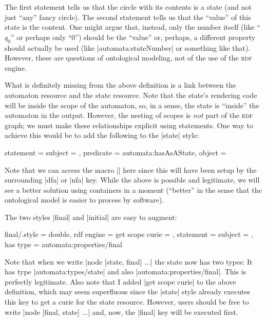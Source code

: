 The first statement tells us that the circle with its contents is a
state (and not just ``any'' fancy circle). The second statement tells
us that the ``value'' of this state is the content. One might argue
that, instead, only the number itself (like ``$q_0$'' or perhaps only
``$0$'') should be the ``value'' or, perhaps, a different property
should actually be used (like |automata:stateNumber| or something like
that). However, these are questions of ontological modeling, not of 
the use of the \textsc{rdf} engine.

What is definitely missing from the above definition is a link between
the automaton resource and the state resource. Note that the state's
rendering code will be inside the scope of the automaton, so, in a
sense, the state is ``inside'' the automaton in the output. However,
the nesting of scopes is \emph{not} part of the \textsc{rdf} graph;
we must make these relationships explicit using statements.
One way to achieve this would be to add the following to the |state|
style:

\begin{codeexample}
    statement = {
      subject     = \mylibAutomatonCurie,
      predicate   = automata:hasAsAState,
      object      = \mylibStateCurie }
\end{codeexample}

Note that we can access the macro |\mylibAutomatonCurie| here since
this will have been setup by the surrounding |dfa| or |nfa| key. While
the above is possible and legitimate, we will see a better solution
using containers in a moment (``better'' in the sense that the
ontological model is easier to process by software).

The two styles |final| and |initial| are easy to augment:

\begin{codeexample}
final/.style = {
  double, %
  rdf engine = {
    get scope curie = \mylibStateCurie,
    statement = {
      subject     = \mylibStateCurie,
      has type    = automata:properties/final } } }
\end{codeexample}

Note that when we write |node [state, final] ...| the state now
has two types: It has type |automata:types/state| and also
|automata:properties/final|. This is perfectly legitimate. Also note
that I added |get scope curie| to the above definition, which may seem
superfluous since the |state| style already executes this key to get a
curie for the state resource. However, users should be free to write
|node [final, state] ...| and, now, the |final| key will be executed
first.

